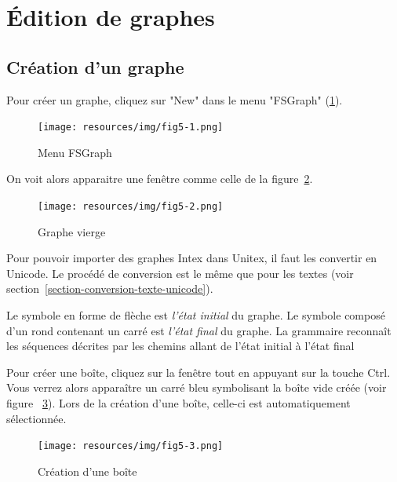 \section{Édition de graphes}
\label{section-editing-graphs}

\subsection{Création d'un graphe}
Pour créer un graphe, cliquez sur "New" dans le menu "FSGraph" (\ref{fig-fsgraph-menu}).

\begin{figure}[!ht]
\begin{center}
\texttt{[image: resources/img/fig5-1.png]}
\caption{Menu FSGraph\label{fig-fsgraph-menu}}
\end{center}
\end{figure}

\bigskip
\noindent On voit alors apparaitre une fenêtre comme celle de la figure~\ref{fig-new-graph}.

\begin{figure}[!ht]
\begin{center}
\texttt{[image: resources/img/fig5-2.png]}
\caption{Graphe vierge\label{fig-new-graph}}
\end{center}
\end{figure}

\bigskip
\noindent Pour pouvoir importer des graphes Intex dans Unitex, il faut les convertir en Unicode. Le
procédé de conversion est le même que pour les textes
(voir section~\ref{section-conversion-texte-unicode}).

\bigskip
\noindent Le symbole en forme de flèche est \textit{l'état initial} du graphe. Le symbole
composé d'un rond contenant un carré est  \textit{l'état final} du graphe. La
grammaire reconnaît les séquences décrites par les chemins allant de l'état initial à l'état final

\bigskip
\noindent Pour créer une boîte, cliquez sur la fenêtre tout en appuyant sur la touche Ctrl. 
 
Vous verrez alors apparaître un carré bleu symbolisant la boîte vide créée (voir figure
~\ref{fig-box-creation}). Lors de la création d’une boîte, celle-ci est automatiquement sélectionnée.

\begin{figure}[!ht]
\begin{center}
\texttt{[image: resources/img/fig5-3.png]}
\caption{Création d’une boîte\label{fig-box-creation}}
\end{center}
\end{figure}

